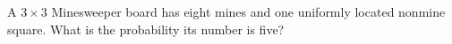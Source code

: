 A $3\times3$ Minesweeper board has eight mines and one uniformly located nonmine square. What is the probability its number is five?
